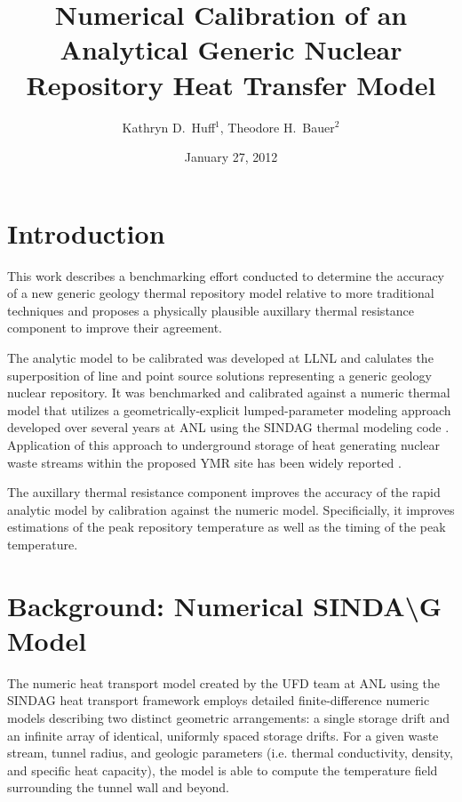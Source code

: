 \documentclass{anstrans}
\title{Numerical Calibration of an Analytical Generic Nuclear Repository Heat 
Transfer Model}
\author{Kathryn D.~Huff$^1$, Theodore H.~Bauer$^2$}
\institute{$^1$Nuclear Engineering \& Engineering Physics Dept., University of 
Wisconsin, Madison, WI, 53706\\
$^2$Nuclear Engineering Division, Argonne National Laboratory, Argonne, IL, 
60439}
\date{January 27, 2012}
\begin{document}
\section{Introduction}

This work describes a benchmarking effort conducted to determine the accuracy of 
a new generic geology thermal repository model
relative to more traditional techniques and proposes a physically plausible auxillary thermal 
resistance component to improve their agreement.  

The analytic model to be calibrated was developed at 
\gls{LLNL}\cite{hardin_generic_2011,sutton_investigations_2011,greenberg_application_2012} 
and calulates the superposition of line and point source solutions representing 
a generic geology nuclear repository. It was benchmarked and calibrated against 
a numeric thermal model that utilizes a geometrically-explicit 
lumped-parameter modeling approach developed over several years at \gls{ANL} 
using the \gls{SINDAG} thermal modeling code 
\cite{gaski_sinda_1987,gaski_sindag_1987}.  Application of this approach to 
underground storage of heat generating nuclear waste streams within the proposed 
\gls{YMR} site has been widely reported \cite{wigeland_separations_2006}. 

The auxillary thermal resistance component improves the accuracy of the rapid 
analytic model by calibration against the numeric model.  Specificially, it 
improves estimations of the peak repository temperature as well as the timing of 
the peak temperature. 





\section{Background: Numerical SINDA{\textbackslash}G Model}

The numeric heat transport model created by the \gls{UFD} team at \gls{ANL} 
using the \gls{SINDAG} heat transport framework employs detailed finite-difference numeric  
models describing two distinct geometric arrangements: a single 
storage drift and an infinite array of identical, uniformly spaced  storage drifts.  
For a given waste stream, tunnel radius, and geologic parameters (i.e. thermal conductivity, density, and 
specific heat capacity), the model is able to compute the temperature field 
surrounding the tunnel wall and beyond.  
\end{document}
